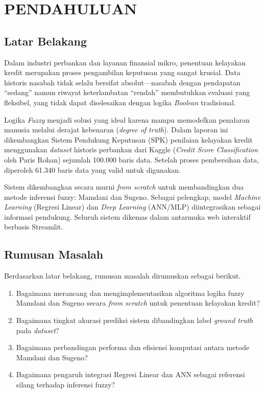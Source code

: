 \documentclass[12pt,a4paper]{report}
\begin{document}
\newpage
{}
\setcounter{page}{1}

\chapter{PENDAHULUAN}

\section{Latar Belakang}

Dalam industri perbankan dan layanan finansial mikro, penentuan
kelayakan kredit merupakan proses pengambilan keputusan yang
sangat krusial. Data historis nasabah tidak selalu bersifat
absolut—nasabah dengan pendapatan ``sedang'' namun riwayat
keterlambatan ``rendah'' membutuhkan evaluasi yang fleksibel,
yang tidak dapat diselesaikan dengan logika \textit{Boolean}
tradisional.

Logika \textit{Fuzzy} menjadi solusi yang ideal karena mampu
memodelkan penalaran manusia melalui derajat kebenaran
(\textit{degree of truth}). Dalam laporan ini dikembangkan
Sistem Pendukung Keputusan (SPK) penilaian kelayakan kredit
menggunakan \textit{dataset} historis perbankan dari Kaggle
(\textit{Credit Score Classification} oleh Paris Rohan)
sejumlah 100.000 baris data. Setelah proses pembersihan data,
diperoleh 61.340 baris data yang valid untuk digunakan.

Sistem dikembangkan secara murni \textit{from scratch} untuk
membandingkan dua metode inferensi fuzzy: Mamdani dan Sugeno.
Sebagai pelengkap, model \textit{Machine Learning} (Regresi
Linear) dan \textit{Deep Learning} (ANN/MLP) diintegrasikan
sebagai informasi pendukung. Seluruh sistem dikemas dalam
antarmuka web interaktif berbasis Streamlit.

\section{Rumusan Masalah}

Berdasarkan latar belakang, rumusan masalah dirumuskan sebagai
berikut.
\begin{enumerate}[label=\arabic*.]
  \item Bagaimana merancang dan mengimplementasikan algoritma
        logika fuzzy Mamdani dan Sugeno secara \textit{from
        scratch} untuk penentuan kelayakan kredit?
  \item Bagaimana tingkat akurasi prediksi sistem dibandingkan
        label \textit{ground truth} pada \textit{dataset}?
  \item Bagaimana perbandingan performa dan efisiensi komputasi
        antara metode Mamdani dan Sugeno?
  \item Bagaimana pengaruh integrasi Regresi Linear dan ANN
        sebagai referensi silang terhadap inferensi fuzzy?
\end{enumerate}
\end{document}
